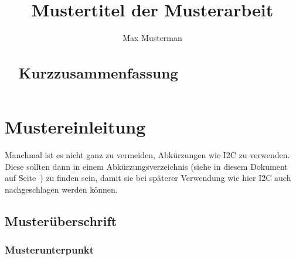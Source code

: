 \documentclass[fontsize=12pt,
parskip=half,	%
department=FakM,  %
twoside, %
DIV=15,BCOR=10mm, %
]{OTHRreprt}
\title{Mustertitel der Musterarbeit}
\author{Max Musterman}
\begin{document}
	\maketitle
	\cleardoublepage
	\begin{abstract}
	\section*{Kurzzusammenfassung}
	\begin{quote}
	\lipsum[1]
	\end{quote}
	\end{abstract}
	\cleardoublepage
	\tableofcontents
	\cleardoublepage		
		
	
	\chapter{Mustereinleitung}
	\lipsum[1]

	Manchmal ist es nicht ganz zu vermeiden, Abkürzungen wie \ac{I2C} zu verwenden. 
	Diese sollten dann in einem Abkürzungsverzeichnis (siehe in diesem Dokument auf Seite~\pageref{Sec:Abkuerzungen}) zu finden sein, damit sie bei späterer Verwendung wie hier \ac{I2C} auch nachgeschlagen werden können.

	\lipsum[2-4]
	\section{Musterüberschrift}
	\lipsum[5-7]
	\subsection{Musterunterpunkt}
	\lipsum[8-9]
\end{document}
